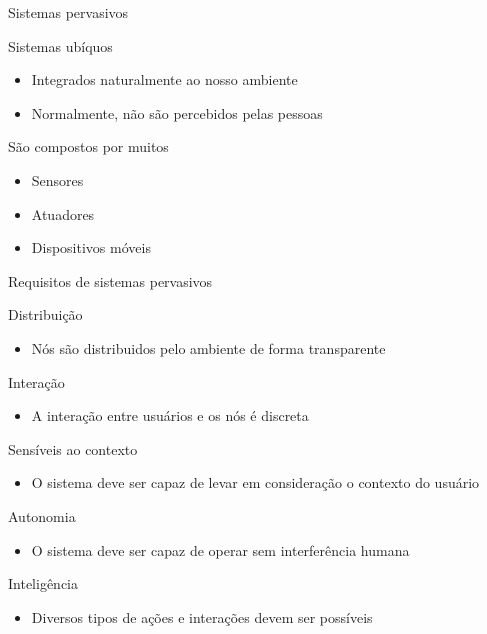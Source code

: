 \documentclass[compress]{beamer}
\begin{document}

\begin{frame}{Sistemas pervasivos}

Sistemas ubíquos
\begin{itemize}
    \item Integrados naturalmente ao nosso ambiente
    \item Normalmente, não são percebidos pelas pessoas
\end{itemize}

\vspace{0.5cm}

São compostos por muitos
\begin{itemize}
    \item Sensores
    \item Atuadores
    \item Dispositivos móveis
\end{itemize}

\end{frame}


\begin{frame}{Requisitos de sistemas pervasivos}

Distribuição
\begin{itemize}
    \item Nós são distribuidos pelo ambiente de forma transparente
\end{itemize}

\vspace{0.2cm}

Interação
\begin{itemize}
    \item A interação entre usuários e os nós é discreta
\end{itemize}

\vspace{0.2cm}

Sensíveis ao contexto
\begin{itemize}
    \item O sistema deve ser capaz de levar em consideração o contexto do usuário
\end{itemize}

\vspace{0.2cm}

Autonomia
\begin{itemize}
    \item O sistema deve ser capaz de operar sem interferência humana
\end{itemize}

\vspace{0.2cm}

Inteligência
\begin{itemize}
    \item Diversos tipos de ações e interações devem ser possíveis
\end{itemize}
\end{frame}
\end{document}
